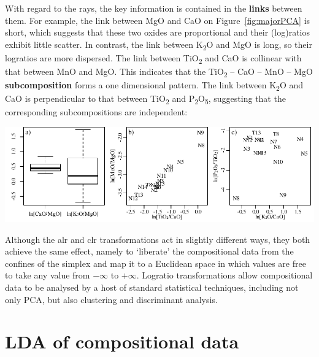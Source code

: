 With regard to the rays, the key information is contained in the
\textbf{links} between them. For example, the link between MgO and CaO
on Figure~\ref{fig:majorPCA} is short, which suggests that these two
oxides are proportional and their (log)ratios exhibit little
scatter. In contrast, the link between K\textsubscript{2}O and MgO is
long, so their logratios are more dispersed. The link between
TiO\textsubscript{2} and CaO is collinear with that between MnO and
MgO. This indicates that the TiO\textsubscript{2} -- CaO -- MnO -- MgO
\textbf{subcomposition} forms a one dimensional pattern. The link
between K\textsubscript{2}O and CaO is perpendicular to that between
TiO\textsubscript{2} and P\textsubscript{2}O\textsubscript{5},
suggesting that the corresponding subcompositions are independent:
\begin{center}
\noindent\includegraphics[width=.95\textwidth]{../figures/links.pdf}
  \label{fig:links}
\end{center}

Although the alr and clr transformations act in slightly different
ways, they both achieve the same effect, namely to `liberate' the
compositional data from the confines of the simplex and map it to a
Euclidean space in which values are free to take any value from
$-\infty$ to $+\infty$. Logratio transformations allow compositional
data to be analysed by a host of standard statistical techniques,
including not only PCA, but also clustering and discriminant analysis.

\section{LDA of compositional data}
\label{sec:compositionalLDA}

